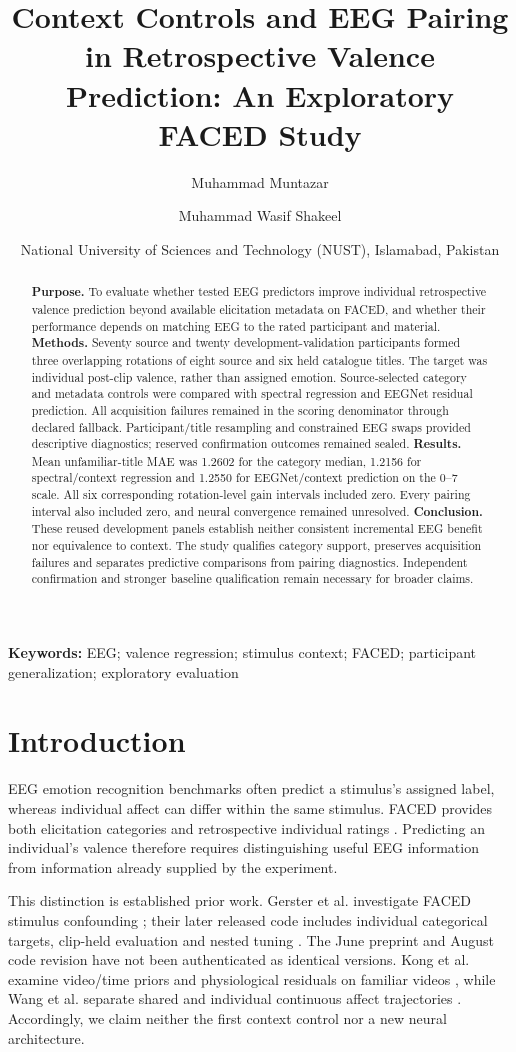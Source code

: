 \documentclass[11pt,a4paper]{article}
\title{Context Controls and EEG Pairing in Retrospective Valence Prediction: An Exploratory FACED Study}
\author{Muhammad Muntazar \and Muhammad Wasif Shakeel}
\date{National University of Sciences and Technology (NUST), Islamabad, Pakistan}
\begin{document}
\maketitle
\begin{abstract}
\textbf{Purpose.} To evaluate whether tested EEG predictors improve individual retrospective valence prediction beyond available elicitation metadata on FACED, and whether their performance depends on matching EEG to the rated participant and material.
\textbf{Methods.} Seventy source and twenty development-validation participants formed three overlapping rotations of eight source and six held catalogue titles. The target was individual post-clip valence, rather than assigned emotion. Source-selected category and metadata controls were compared with spectral regression and EEGNet residual prediction. All acquisition failures remained in the scoring denominator through declared fallback. Participant/title resampling and constrained EEG swaps provided descriptive diagnostics; reserved confirmation outcomes remained sealed.
\textbf{Results.} Mean unfamiliar-title MAE was 1.2602 for the category median, 1.2156 for spectral/context regression and 1.2550 for EEGNet/context prediction on the 0--7 scale. All six corresponding rotation-level gain intervals included zero. Every pairing interval also included zero, and neural convergence remained unresolved.
\textbf{Conclusion.} These reused development panels establish neither consistent incremental EEG benefit nor equivalence to context. The study qualifies category support, preserves acquisition failures and separates predictive comparisons from pairing diagnostics. Independent confirmation and stronger baseline qualification remain necessary for broader claims.
\end{abstract}
\noindent\textbf{Keywords:} EEG; valence regression; stimulus context; FACED; participant generalization; exploratory evaluation

\section{Introduction}
EEG emotion recognition benchmarks often predict a stimulus's assigned label, whereas individual affect can differ within the same stimulus. FACED provides both elicitation categories and retrospective individual ratings \cite{chen2023faced}. Predicting an individual's valence therefore requires distinguishing useful EEG information from information already supplied by the experiment.

This distinction is established prior work. Gerster et al. investigate FACED stimulus confounding \cite{gerster2026stimulus}; their later released code includes individual categorical targets, clip-held evaluation and nested tuning \cite{gerster2026code}. The June preprint and August code revision have not been authenticated as identical versions. Kong et al. examine video/time priors and physiological residuals on familiar videos \cite{kong2026priors}, while Wang et al. separate shared and individual continuous affect trajectories \cite{wang2026shared}. Accordingly, we claim neither the first context control nor a new neural architecture.
\end{document}
